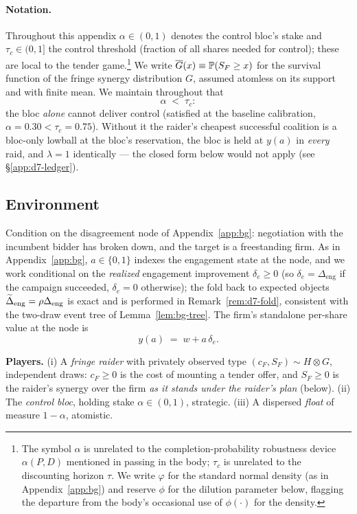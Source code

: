 \paragraph{Notation.}
Throughout this appendix $\alpha\in(0,1)$ denotes the control bloc's stake and $\tau_{c}\in(0,1]$ the control threshold (fraction of all shares needed for control); these are local to the tender game.\footnote{The symbol $\alpha$ is unrelated to the completion-probability robustness device $\alpha(P,D)$ mentioned in passing in the body; $\tau_{c}$ is unrelated to the discounting horizon $\tau$. We write $\varphi$ for the standard normal density (as in Appendix~\ref{app:bg}) and reserve $\phi$ for the dilution parameter below, flagging the departure from the body's occasional use of $\phi(\cdot)$ for the density.} We write $\overline{G}(x)\equiv\mathbb{P}(S_{F}\ge x)$ for the survival function of the fringe synergy distribution $G$, assumed atomless on its support and with finite mean. We maintain throughout that
\[
\alpha\;<\;\tau_{c}:
\]
the bloc \emph{alone} cannot deliver control (satisfied at the baseline calibration, $\alpha=0.30<\tau_{c}=0.75$). Without it the raider's cheapest successful coalition is a bloc-only lowball at the bloc's reservation, the bloc is held at $y(a)$ in \emph{every} raid, and $\lambda=1$ identically --- the closed form below would not apply (see \S\ref{app:d7-ledger}).

\subsection{Environment}
\label{app:d7-env}

Condition on the disagreement node of Appendix~\ref{app:bg}: negotiation with the incumbent bidder has broken down, and the target is a freestanding firm. As in Appendix~\ref{app:bg}, $a\in\{0,1\}$ indexes the engagement state at the node, and we work conditional on the \emph{realized} engagement improvement $\delta_{e}\ge 0$ (so $\delta_{e}=\Delta_{\mathrm{eng}}$ if the campaign succeeded, $\delta_{e}=0$ otherwise); the fold back to expected objects $\widetilde{\Delta}_{\mathrm{eng}}=\rho\Delta_{\mathrm{eng}}$ is exact and is performed in Remark~\ref{rem:d7-fold}, consistent with the two-draw event tree of Lemma~\ref{lem:bg-tree}. The firm's standalone per-share value at the node is
\[
y(a)\;=\;w+a\,\delta_{e}.
\]

\textbf{Players.} (i) A \emph{fringe raider} with privately observed type $(c_{F},S_{F})\sim H\otimes G$, independent draws: $c_{F}\ge0$ is the cost of mounting a tender offer, and $S_{F}\ge 0$ is the raider's synergy over the firm \emph{as it stands under the raider's plan} (below). (ii) The \emph{control bloc}, holding stake $\alpha\in(0,1)$, strategic. (iii) A dispersed \emph{float} of measure $1-\alpha$, atomistic.

